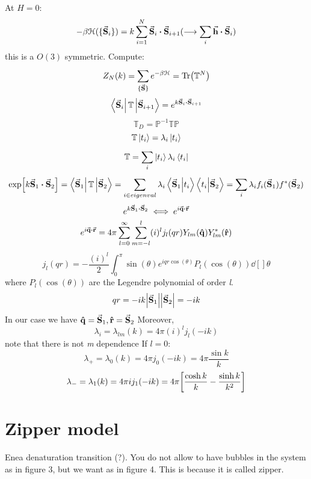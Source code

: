 \documentclass[../main/main.tex]{subfiles}
\begin{document}
At \( H=0 \):
\begin{equation}
  - \beta \mathcal{H} ( \{ \va{S}_i \}  ) = k \sum_{i=1}^{N} \va{S}_i \vdot \va{S}_{i+1} (\longrightarrow \sum_{i}^{} \va{h} \vdot \va{S}_i  )
\end{equation}
this is a \( O(3) \) symmetric.
Compute:
\begin{equation}
  Z_N (k) = \sum_{\{ \va{S} \}  }^{} e^{-\beta \mathcal{H}}  = \Tr(\mathbb{T}^N)
\end{equation}
\begin{equation}
  \bra{\va{S}_i} \mathbb{T} \ket{\va{S}_{i+1}} = e^{k \va{S}_i \vdot \va{S}_{i+1}}
\end{equation}
\begin{equation}
  \mathbb{T}_D = \mathbb{P}^{-1} \mathbb{T}\mathbb{P}
\end{equation}
\begin{equation}
  \mathbb{T} \ket{t_i} = \lambda _i \ket{t_i}
\end{equation}
\begin{equation}
  \mathbb{T} = \sum_{i}^{} \ket{t_i} \lambda _i \bra{t_i}
\end{equation}
\begin{equation}
  \exp [k \va{S}_1\vdot \va{S}_{2}] = \bra{\va{S}_1} \mathbb{T} \ket{\va{S}_2} = \sum_{i \in eigenval}^{} \lambda _i \braket{\va{S}_1}{t_i}  \braket{t_i}{\va{S}_2}
  = \sum_{i}^{} \lambda _i f_i ( \va{S}_1) f^* (\va{S}_2)
\end{equation}
\begin{equation}
  e^{k \va{S}_1\vdot \va{S}_2 } \iff e^{i \va{q}\vdot \va{r}}
\end{equation}
\begin{equation}
  e^{i \va{q}\vdot \va{r}} = 4 \pi \sum_{l=0}^{\infty } \sum_{m=-l}^{l} (i)^l j_l (qr) Y_{lm} (\vu{q}) Y^*_{lm} (\vu{r})
\end{equation}
\begin{equation}
  j_l (qr) = - \frac{(i)^l}{2} \int_{0}^{\pi} \sin(\theta ) e^{i q r \cos(\theta ) } P_l (\cos(\theta ) ) \dd[]{\theta }
\end{equation}
where \( P_l (\cos(\theta ) ) \)  are the Legendre polynomial of order \emph{l}.
\begin{equation}
  qr = -ik \abs{\va{S}_1} \abs{\va{S}_2} = -ik
\end{equation}
In our case we have
\( \vu{q} = \va{S}_1, \vu{r} = \va{S}_2 \)
Moreover,
\begin{equation}
  \lambda _i = \lambda _{lm} (k) = 4 \pi (i)^l j_l (-ik)
\end{equation}
note that there is not \emph{m} dependence
If \( l=0 \):
\begin{equation}
  \lambda _+ = \lambda _0 (k) = 4 \pi j_0 (-ik) = 4 \pi \frac{\sin k }{k}
\end{equation}
\begin{equation}
  \lambda _- = \lambda _1 (k) = 4 \pi i j_1 (-ik) = 4 \pi \qty[\frac{\cosh k }{k}-\frac{\sinh k }{k^2}]
\end{equation}

\section{Zipper model}
Enea denaturation transition (?). You do not allow to have bubbles in the system as in figure 3, but we want as in figure 4.  This is because it is called zipper.
\end{document}
